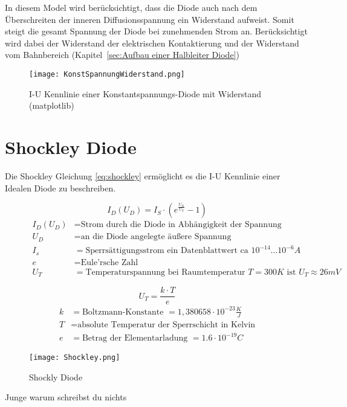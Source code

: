 In diesem Model wird berücksichtigt, dass die Diode auch nach dem Überschreiten der inneren Diffusionsspannung ein Widerstand aufweist. Somit steigt die gesamt Spannung der Diode bei zunehmenden Strom an. Berücksichtigt wird dabei der Widerstand der elektrischen Kontaktierung und der Widerstand vom Bahnbereich (Kapitel\,     \ref{sec:Aufbau einer Halbleiter Diode}) 

\begin{figure}[!htb]
\centering
\texttt{[image: KonstSpannungWiderstand.png]} 
\caption{I-U Kennlinie einer Konstantspannungs-Diode mit Widerstand (matplotlib)}
\end{figure}

\newpage
\section{Shockley Diode}

Die Shockley Gleichung \eqref{eq:shockley} ermöglicht es die I-U Kennlinie einer Idealen Diode zu beschreiben. 

\begin{figure}[!htb]
\begin{equation}
I_{D} (U_{D}) = I_{S} \cdot \left(e^{\frac{U_{D}}{U_{T}}}-1\right)
\label{eq:shockley}
\end{equation}
\begin{align*}
I_{D}(U_{D}) &= \text{Strom durch die Diode in Abhängigkeit der Spannung an der Diode}\\
U_{D} &= \text{an die Diode angelegte äußere Spannung}\\
I_{s} &= \text{Sperrsättigungsstrom ein Datenblattwert ca $10^{-14}\ldots 10^{-6}A$}\\
e &= \text{Eule'rsche Zahl}\\
U_{T} &= \text{Temperaturspannung bei Raumtemperatur $T = 300K $ ist $U_{T} \approx 26mV$ }
\end{align*}
\end{figure}

\begin{figure}[!htb]
\begin{equation}
U_{T} = \dfrac{k \cdot T}{e}
\label{Temperaturspannung}
\end{equation}
\begin{align*}
k &= \text{Boltzmann-Konstante $= 1,380658 \cdot 10^{-23} \scriptstyle \frac{K}{J}$} \\
T &= \text{absolute Temperatur der Sperrschicht in Kelvin}\\
e &= \text{Betrag der Elementarladung $= 1.6 \cdot 10^{-19}C$}
\end{align*}
\end{figure}
\begin{figure}[!hbt]
\centering
\texttt{[image: Shockley.png]}
\caption{Shockly Diode}
\end{figure}

Junge warum schreibst du nichts 
